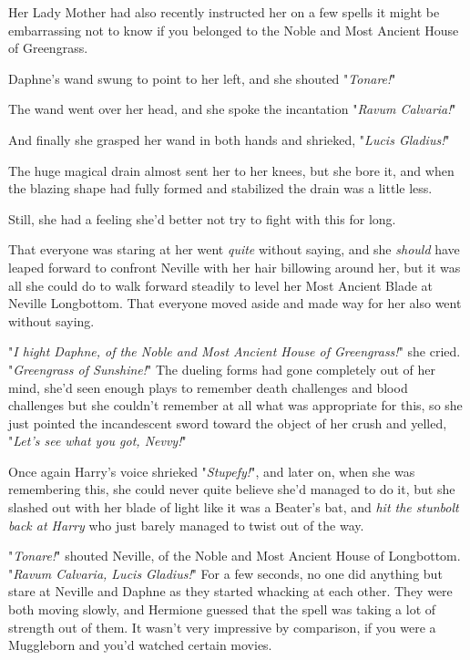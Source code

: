 Her Lady Mother had also recently instructed her on a few spells it might be
embarrassing not to know if you belonged to the Noble and Most Ancient House of
Greengrass.

Daphne's wand swung to point to her left, and she shouted "\emph{Tonare!}"

The wand went over her head, and she spoke the incantation "\emph{Ravum
Calvaria!}"

And finally she grasped her wand in both hands and shrieked, "\emph{Lucis
Gladius!}"

The huge magical drain almost sent her to her knees, but she bore it, and when
the blazing shape had fully formed and stabilized the drain was a little less.

Still, she had a feeling she'd better not try to fight with this for long.

That everyone was staring at her went \emph{quite} without saying, and she
\emph{should} have leaped forward to confront Neville with her hair billowing
around her, but it was all she could do to walk forward steadily to level her
Most Ancient Blade at Neville Longbottom. That everyone moved aside and made
way for her also went without saying.

"\emph{I hight Daphne, of the Noble and Most Ancient House of Greengrass!}" she
cried. "\emph{Greengrass of Sunshine!}" The dueling forms had gone completely
out of her mind, she'd seen enough plays to remember death challenges and blood
challenges but she couldn't remember at all what was appropriate for this, so
she just pointed the incandescent sword toward the object of her crush and
yelled, "\emph{Let's see what you got, Nevvy!}"

Once again Harry's voice shrieked "\emph{Stupefy!}", and later on, when she was
remembering this, she could never quite believe she'd managed to do it, but she
slashed out with her blade of light like it was a Beater's bat, and \emph{hit
the stunbolt back at Harry} who just barely managed to twist out of the way.

"\emph{Tonare!}" shouted Neville, of the Noble and Most Ancient House of
Longbottom. "\emph{Ravum Calvaria, Lucis Gladius!}"
\sbreak
For a few seconds, no one did anything but stare at Neville and Daphne as they
started whacking at each other. They were both moving slowly, and Hermione
guessed that the spell was taking a lot of strength out of them. It wasn't very
impressive by comparison, if you were a Muggleborn and you'd watched certain
movies.

